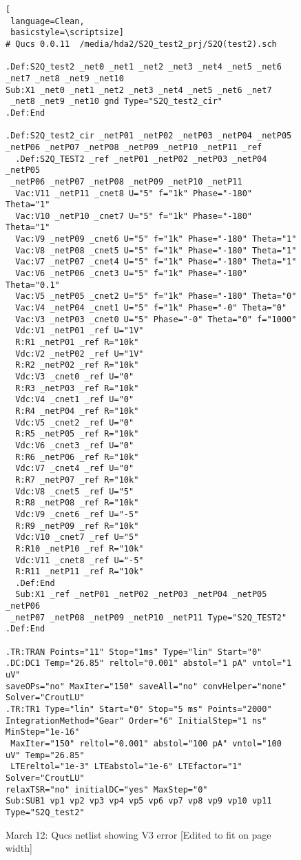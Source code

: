 \begin{figure} 
  \centering
\begin{lstlisting}[
 language=Clean, 
 basicstyle=\scriptsize]
# Qucs 0.0.11  /media/hda2/S2Q_test2_prj/S2Q(test2).sch

.Def:S2Q_test2 _net0 _net1 _net2 _net3 _net4 _net5 _net6 
_net7 _net8 _net9 _net10
Sub:X1 _net0 _net1 _net2 _net3 _net4 _net5 _net6 _net7
 _net8 _net9 _net10 gnd Type="S2Q_test2_cir"
.Def:End

.Def:S2Q_test2_cir _netP01 _netP02 _netP03 _netP04 _netP05 
_netP06 _netP07 _netP08 _netP09 _netP10 _netP11 _ref
  .Def:S2Q_TEST2 _ref _netP01 _netP02 _netP03 _netP04 _netP05
 _netP06 _netP07 _netP08 _netP09 _netP10 _netP11
  Vac:V11 _netP11 _cnet8 U="5" f="1k" Phase="-180" Theta="1"
  Vac:V10 _netP10 _cnet7 U="5" f="1k" Phase="-180" Theta="1"
  Vac:V9 _netP09 _cnet6 U="5" f="1k" Phase="-180" Theta="1"
  Vac:V8 _netP08 _cnet5 U="5" f="1k" Phase="-180" Theta="1"
  Vac:V7 _netP07 _cnet4 U="5" f="1k" Phase="-180" Theta="1"
  Vac:V6 _netP06 _cnet3 U="5" f="1k" Phase="-180" Theta="0.1"
  Vac:V5 _netP05 _cnet2 U="5" f="1k" Phase="-180" Theta="0"
  Vac:V4 _netP04 _cnet1 U="5" f="1k" Phase="-0" Theta="0"
  Vac:V3 _netP03 _cnet0 U="5" Phase="-0" Theta="0" f="1000"
  Vdc:V1 _netP01 _ref U="1V"
  R:R1 _netP01 _ref R="10k"
  Vdc:V2 _netP02 _ref U="1V"
  R:R2 _netP02 _ref R="10k"
  Vdc:V3 _cnet0 _ref U="0"
  R:R3 _netP03 _ref R="10k"
  Vdc:V4 _cnet1 _ref U="0"
  R:R4 _netP04 _ref R="10k"
  Vdc:V5 _cnet2 _ref U="0"
  R:R5 _netP05 _ref R="10k"
  Vdc:V6 _cnet3 _ref U="0"
  R:R6 _netP06 _ref R="10k"
  Vdc:V7 _cnet4 _ref U="0"
  R:R7 _netP07 _ref R="10k"
  Vdc:V8 _cnet5 _ref U="5"
  R:R8 _netP08 _ref R="10k"
  Vdc:V9 _cnet6 _ref U="-5"
  R:R9 _netP09 _ref R="10k"
  Vdc:V10 _cnet7 _ref U="5"
  R:R10 _netP10 _ref R="10k"
  Vdc:V11 _cnet8 _ref U="-5"
  R:R11 _netP11 _ref R="10k"
  .Def:End
  Sub:X1 _ref _netP01 _netP02 _netP03 _netP04 _netP05 _netP06
 _netP07 _netP08 _netP09 _netP10 _netP11 Type="S2Q_TEST2"
.Def:End

.TR:TRAN Points="11" Stop="1ms" Type="lin" Start="0"
.DC:DC1 Temp="26.85" reltol="0.001" abstol="1 pA" vntol="1 uV" 
saveOPs="no" MaxIter="150" saveAll="no" convHelper="none" Solver="CroutLU"
.TR:TR1 Type="lin" Start="0" Stop="5 ms" Points="2000" 
IntegrationMethod="Gear" Order="6" InitialStep="1 ns" MinStep="1e-16"
 MaxIter="150" reltol="0.001" abstol="100 pA" vntol="100 uV" Temp="26.85"
 LTEreltol="1e-3" LTEabstol="1e-6" LTEfactor="1" Solver="CroutLU" 
relaxTSR="no" initialDC="yes" MaxStep="0"
Sub:SUB1 vp1 vp2 vp3 vp4 vp5 vp6 vp7 vp8 vp9 vp10 vp11 Type="S2Q_test2"

\end{lstlisting}
 \caption{March 12: Qucs netlist showing V3 error [Edited to fit on page width]}
  \label{fig:S2Qtest2_2}
\end{figure} 


